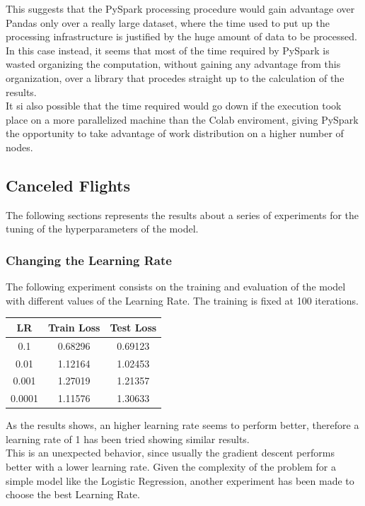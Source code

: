 \documentclass[
	letterpaper, %
	10pt, %
]{class}
\begin{document}
This suggests that the PySpark processing procedure would gain advantage over Pandas only over a really large dataset, where the time used to put up the processing infrastructure is justified by the huge amount of data to be processed.
In this case instead, it seems that most of the time required by PySpark is wasted organizing the computation, without gaining any advantage from this organization, over a library that procedes straight up to the calculation of the results.\\

It si also possible that the time required would go down if the execution took place on a more parallelized machine than the Colab enviroment, giving PySpark the opportunity to take advantage of work distribution on a higher number of nodes.

\subsection{Canceled Flights}

The following sections represents the results about a series of experiments for the tuning of the hyperparameters of the model.

\subsubsection{Changing the Learning Rate}

The following experiment consists on the training and evaluation of the model with different values of the Learning Rate. The training is fixed at 100 iterations.

\begin{center}
    \begin{tabular}{ |c|c|c| }
        \hline
        LR     & Train Loss & Test Loss \\
        \hline
        0.1    & 0.68296    & 0.69123   \\
        0.01   & 1.12164    & 1.02453   \\
        0.001  & 1.27019    & 1.21357   \\
        0.0001 & 1.11576    & 1.30633   \\
        \hline
    \end{tabular}
\end{center}

As the results shows, an higher learning rate seems to perform better, therefore a learning rate of 1 has been tried showing similar results.\\
This is an unexpected behavior, since usually the gradient descent performs better with a lower learning rate. Given the complexity of the problem for a simple model like the Logistic Regression, another experiment has been made to choose the best Learning Rate.\\
\end{document}
